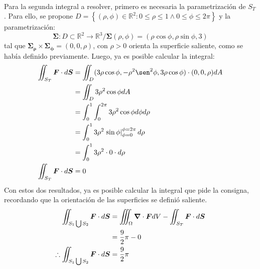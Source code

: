 \begin{solution}
\begin{align*}
    \end{align*}
    Para la segunda integral a resolver, primero es necesaria la parametrización de $S_T$. Para ello, se propone 
    $D=\left\{(\rho,\phi) \in \mathbb{R}^2 : 0\leq\rho\leq1 \land 0\leq\phi\leq2\pi\right\}$ y la parametrización:
    \begin{equation*}
        \boldsymbol{\Sigma} : D \subset \mathbb{R}^2 \longrightarrow \mathbb{R}^3 / \boldsymbol{\Sigma}(\rho,\phi) = \left(\rho\cos{\phi},\rho\sin{\phi},3\right)
    \end{equation*}
    tal que $\boldsymbol{\Sigma_{\rho}}\times\boldsymbol{\Sigma_{\phi}} = \left(0,0,\rho\right)$, con $\rho>0$ orienta la superficie saliente, como se había definido previamente.
    Luego, ya es posible calcular la integral:
    \begin{align*}
        \iint_{S_T} \boldsymbol{F} \cdot d\boldsymbol{S} &= \iint_{D} (3\rho\cos{\phi},-\rho^2\sen^2{\phi},3\rho\cos{\phi}) \cdot (0,0,\rho)dA\\
        &= \iint_{D} 3\rho^2\cos{\phi}dA\\
        &= \int_{0}^{1} \int_{0}^{2\pi} 3\rho^2\cos{\phi} d\phi d\rho\\
        &= \int_{0}^{1} 3\rho^2\left.\sin{\phi}\right|_{\phi=0}^{\phi=2\pi} d\rho \\
        &= \int_{0}^{1} 3\rho^2\cdot 0 \cdot d\rho\\
        \iint_{S_T} \boldsymbol{F} \cdot d\boldsymbol{S} &= 0 \\
    \end{align*}
    Con estos dos resultados, ya es posible calcular la integral que pide la consigna, recordando que la orientación de las superficies se definió saliente.
    \begin{align*}
        \iint_{S_1 \bigcup S_2} \boldsymbol{F} \cdot d\boldsymbol{S} &= \iiint_{\Omega} \grad \cdot \boldsymbol{F} dV - \iint_{S_T} \boldsymbol{F} \cdot d\boldsymbol{S}\\
        &= \frac{9}{2}\pi - 0\\
        \therefore \iint_{S_1 \bigcup S_2} \boldsymbol{F} \cdot d\boldsymbol{S} &= \frac{9}{2}\pi
    \end{align*}
\end{solution}


